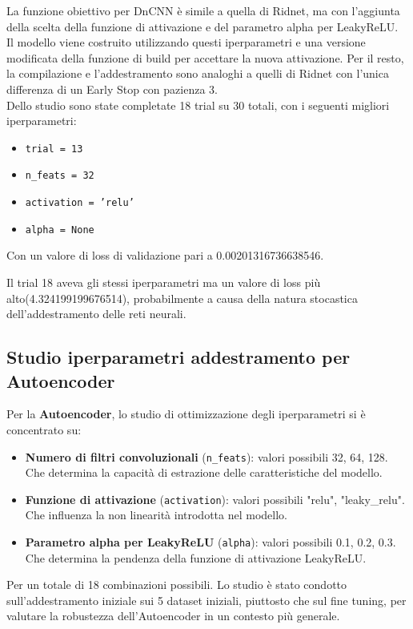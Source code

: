 \documentclass[12pt,a4paper,openright,twoside]{book}
\begin{document}
La funzione obiettivo per DnCNN è simile a quella di Ridnet, ma con l'aggiunta della scelta della funzione di attivazione e del parametro alpha per LeakyReLU.\\
Il modello viene costruito utilizzando questi iperparametri e una versione modificata della funzione di build per accettare la nuova attivazione.
Per il resto, la compilazione e l'addestramento sono analoghi a quelli di Ridnet con l'unica differenza di un Early Stop con pazienza 3.\\
Dello studio sono state completate 18 trial su 30 totali, con i seguenti migliori iperparametri:
\begin{itemize}
    \item [-] \texttt{trial = 13}
    \item [-] \texttt{n\_feats = 32}
    \item [-] \texttt{activation = 'relu'}
    \item [-] \texttt{alpha = None}
\end{itemize}
Con un valore di loss di validazione pari a 0.00201316736638546.

Il trial 18 aveva gli stessi iperparametri ma un valore di loss più alto(4.324199199676514), probabilmente a causa della natura stocastica dell'addestramento delle reti neurali.

\subsection*{Studio iperparametri addestramento per Autoencoder}
Per la \textbf{Autoencoder}, lo studio di ottimizzazione degli iperparametri si è concentrato su: 
\begin{itemize}
    \item [-] \textbf{Numero di filtri convoluzionali} (\texttt{n\_feats}): valori possibili 32, 64, 128. Che determina la capacità di estrazione delle caratteristiche del modello.
    \item [-] \textbf{Funzione di attivazione} (\texttt{activation}): valori possibili "relu", "leaky\_relu". Che influenza la non linearità introdotta nel modello.
    \item [-] \textbf{Parametro alpha per LeakyReLU} (\texttt{alpha}): valori possibili 0.1, 0.2, 0.3. Che determina la pendenza della funzione di attivazione LeakyReLU.
\end{itemize}
Per un totale di 18 combinazioni possibili.
Lo studio è stato condotto sull'addestramento iniziale sui 5 dataset iniziali, piuttosto che sul fine tuning, per valutare la robustezza dell'Autoencoder in un contesto più generale.
\end{document}
